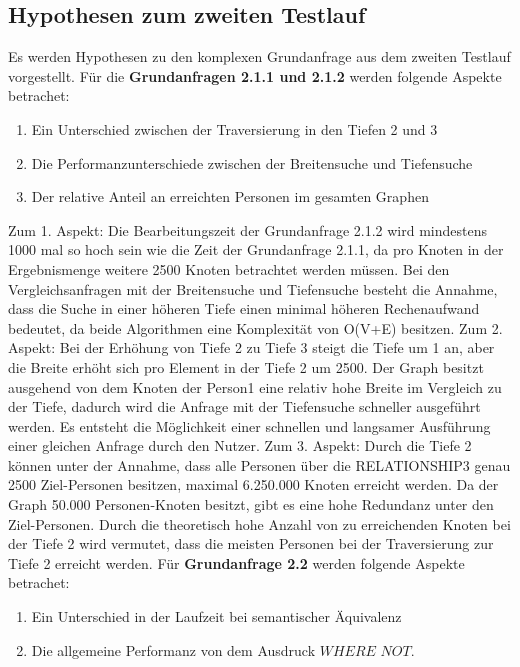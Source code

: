 \subsection{Hypothesen zum zweiten Testlauf}
Es werden Hypothesen zu den komplexen Grundanfrage aus dem zweiten Testlauf vorgestellt. \newline \newline
Für die \textbf{Grundanfragen 2.1.1 und 2.1.2} werden folgende Aspekte betrachet: 
\begin{enumerate}
	\item Ein Unterschied zwischen der Traversierung in den Tiefen 2 und 3 
	\item Die Performanzunterschiede zwischen der Breitensuche und Tiefensuche
	\item Der relative Anteil an erreichten Personen im gesamten Graphen
\end{enumerate}
Zum 1. Aspekt: Die Bearbeitungszeit der Grundanfrage 2.1.2 wird mindestens 1000 mal so hoch sein wie die Zeit der Grundanfrage 2.1.1, da pro Knoten in der Ergebnismenge weitere 2500 Knoten betrachtet werden müssen. Bei den Vergleichsanfragen mit der  Breitensuche und Tiefensuche besteht die Annahme, dass die Suche in einer höheren Tiefe einen minimal höheren Rechenaufwand bedeutet, da beide Algorithmen eine Komplexität von O(V+E) besitzen. \newline
Zum 2. Aspekt: Bei der Erhöhung von Tiefe 2 zu Tiefe 3 steigt die Tiefe um 1 an, aber die Breite erhöht sich pro Element in der Tiefe 2 um 2500. Der Graph besitzt ausgehend von dem Knoten der Person1 eine relativ hohe Breite im Vergleich zu der Tiefe, dadurch wird die Anfrage mit der Tiefensuche  schneller ausgeführt werden. Es entsteht die Möglichkeit einer schnellen und langsamer Ausführung einer gleichen Anfrage durch den Nutzer. \newline
Zum 3. Aspekt: Durch die Tiefe 2 können unter der Annahme, dass alle Personen über die RELATIONSHIP3 genau 2500 Ziel-Personen besitzen, maximal 6.250.000 Knoten erreicht werden. Da der Graph 50.000 Personen-Knoten besitzt, gibt es eine hohe Redundanz unter den Ziel-Personen. Durch die theoretisch hohe Anzahl von zu erreichenden Knoten bei der Tiefe 2 wird vermutet, dass die meisten Personen bei der Traversierung zur Tiefe 2 erreicht werden. \newline \newline
Für \textbf{Grundanfrage 2.2} werden folgende Aspekte betrachet: 
\begin{enumerate}
	\item Ein Unterschied in der Laufzeit bei  semantischer Äquivalenz  
	\item Die allgemeine Performanz von dem Ausdruck $WHERE$ $NOT$.
\end{enumerate}
